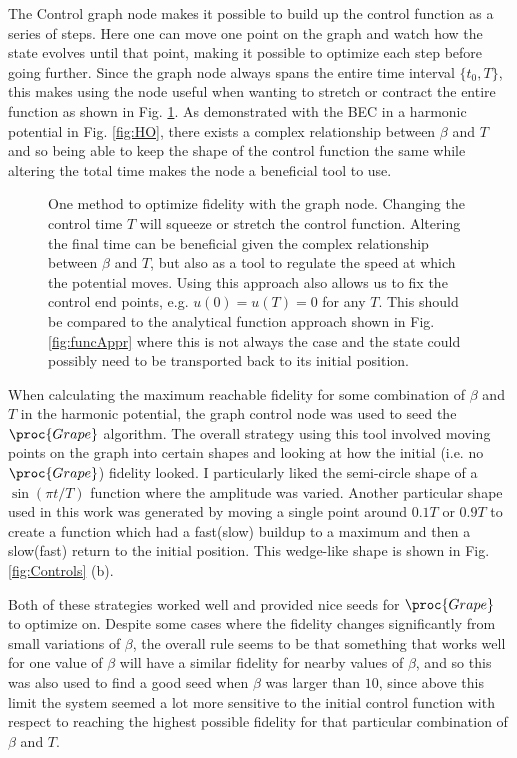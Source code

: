 \documentclass[a4paper, twocolumn]{revtex4-1}
\begin{document}
The Control graph node makes it possible to build up the control function as a series of steps. Here one can move one point on the graph and watch how the state evolves until that point, making it possible to optimize each step before going further. Since the graph node always spans the entire time interval $\{t_0,T\}$, this makes using the node useful when wanting to stretch or contract the entire function as shown in Fig. \ref{fig:graphAppr}. As demonstrated with the BEC in a harmonic potential in Fig. \ref{fig:HO}, there exists a complex relationship between $\beta$ and $T$ and so being able to keep the shape of the control function the same while altering the total time makes the node a beneficial tool to use.\\

\begin{figure}
	\def\svgwidth{\columnwidth}
	
	\caption{One method to optimize fidelity with the graph node. Changing the control time $T$ will squeeze or stretch the control function. Altering the final time can be beneficial given the complex relationship between $\beta$ and $T$, but also as a tool to regulate the speed at which the potential moves. Using this approach also allows us to fix the control end points, e.g. $u(0)=u(T)=0$ for any $T$. This should be compared to the analytical function approach shown in Fig. \ref{fig:funcAppr} where this is not always the case and the state could possibly need to be transported back to its initial position.}
	\label{fig:graphAppr}
\end{figure}

When calculating the maximum reachable fidelity for some combination of $\beta$ and $T$ in the harmonic potential, the graph control node was used to seed the $\proc{Grape}$ algorithm. The overall strategy using this tool involved moving points on the graph into certain shapes and looking at how the initial (i.e. no $\proc{Grape}$) fidelity looked. I particularly liked the semi-circle shape of a $\sin(\pi t/T)$ function where the amplitude was varied. Another particular shape used in this work was generated by moving a single point around $0.1T$ or $0.9T$ to create a function which had a fast(slow) buildup to a maximum and then a slow(fast) return to the initial position. This wedge-like shape is shown in Fig. \ref{fig:Controls} (b).

Both of these strategies worked well and provided nice seeds for $\proc{Grape}$ to optimize on. Despite some cases where the fidelity changes significantly from small variations of $\beta$, the overall rule seems to be that something that works well for one value of $\beta$ will have a similar fidelity for nearby values of $\beta$, and so this was also used to find a good seed when $\beta$ was larger than $10$, since above this limit the system seemed a lot more sensitive to the initial control function with respect to reaching the highest possible fidelity for that particular combination of $\beta$ and $T$. \\
\end{document}
